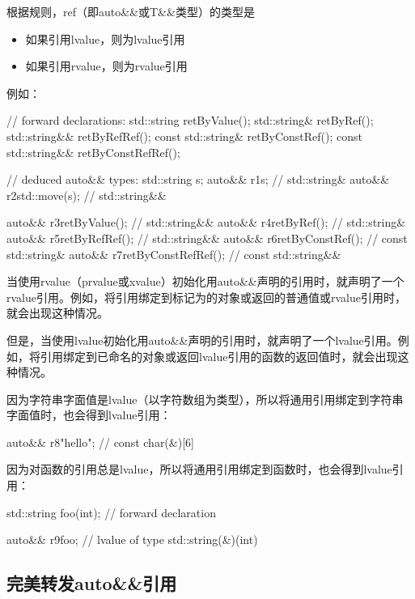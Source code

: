 根据规则，ref（即auto\&\&或T\&\&类型）的类型是

\begin{itemize}
	\item 如果引用lvalue，则为lvalue引用
	\item 如果引用rvalue，则为rvalue引用
\end{itemize}

例如：

\begin{cppcode}
// forward declarations:
std::string retByValue();
std::string& retByRef();
std::string&& retByRefRef();
const std::string& retByConstRef();
const std::string&& retByConstRefRef();

// deduced auto&& types:
std::string s;
auto&& r1{s}; // std::string&
auto&& r2{std::move(s)}; // std::string&&

auto&& r3{retByValue()}; // std::string&&
auto&& r4{retByRef()}; // std::string&
auto&& r5{retByRefRef()}; // std::string&&
auto&& r6{retByConstRef()}; // const std::string&
auto&& r7{retByConstRefRef()}; // const std::string&&
\end{cppcode}

当使用rvalue（prvalue或xvalue）初始化用auto\&\&声明的引用时，就声明了一个rvalue引用。例如，将引用绑定到标记为的对象或返回的普通值或rvalue引用时，就会出现这种情况。

但是，当使用lvalue初始化用auto\&\&声明的引用时，就声明了一个lvalue引用。例如，将引用绑定到已命名的对象或返回lvalue引用的函数的返回值时，就会出现这种情况。

因为字符串字面值是lvalue（以字符数组为类型），所以将通用引用绑定到字符串字面值时，也会得到lvalue引用：

\begin{cppcode}
auto&& r8{"hello"}; // const char(&)[6]
\end{cppcode}

因为对函数的引用总是lvalue，所以将通用引用绑定到函数时，也会得到lvalue引用：

\begin{cppcode}
std::string foo(int); // forward declaration

auto&& r9{foo}; // lvalue of type std::string(&)(int)
\end{cppcode}

\subsection{完美转发auto\&\&引用}

